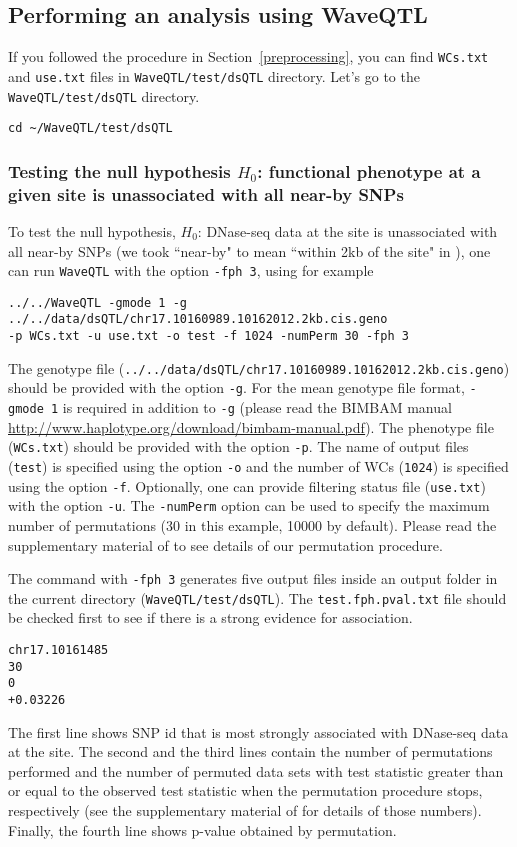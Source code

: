 \documentclass[11pt]{article}
\begin{document}
\subsection{Performing an analysis using WaveQTL}
If you followed the procedure in Section~\ref{preprocessing}, you can find {\tt WCs.txt} and {\tt use.txt} files in {\tt WaveQTL/test/dsQTL} directory. Let's go to the {\tt WaveQTL/test/dsQTL} directory.
\begin{verbatim}
cd ~/WaveQTL/test/dsQTL
\end{verbatim}
\subsubsection{Testing the null hypothesis $H_0$: functional phenotype at a given site is unassociated with all near-by SNPs}
To test the null hypothesis, $H_0$: DNase-seq data at the site is unassociated with all near-by SNPs (we took ``near-by" to mean ``within 2kb of the
site" in \cite{Shim2014}), one can run {\tt WaveQTL} with the option {\tt -fph 3}, using for example
\begin{verbatim}
../../WaveQTL -gmode 1 -g ../../data/dsQTL/chr17.10160989.10162012.2kb.cis.geno 
-p WCs.txt -u use.txt -o test -f 1024 -numPerm 30 -fph 3
\end{verbatim}
The genotype file ({\tt ../../data/dsQTL/chr17.10160989.10162012.2kb.cis.geno}) should be provided with the option {\tt -g}. For the mean genotype file format, {\tt -gmode 1} is required in addition to {\tt -g} (please read the BIMBAM manual \url{http://www.haplotype.org/download/bimbam-manual.pdf}).  The phenotype file ({\tt WCs.txt}) should be provided with the option {\tt -p}. The name of output files ({\tt test}) is specified using the option {\tt -o} and the number of WCs ({\tt 1024}) is specified using the option {\tt -f}. Optionally, one can provide filtering status file ({\tt use.txt}) with the option {\tt -u}. The {\tt -numPerm} option can be used to specify the maximum number of permutations (30 in this example, 10000 by default). Please read the supplementary material of \cite{Shim2014} to see details of our permutation procedure. 

The command with {\tt -fph 3} generates five output files inside an output folder in the current directory ({\tt WaveQTL/test/dsQTL}). The {\tt test.fph.pval.txt} file should be checked first to see if there is a strong evidence for association.
\begin{verbatim}
chr17.10161485
30
0
+0.03226
\end{verbatim}
The first line shows SNP id that is most strongly associated with DNase-seq data at the site. The second and the third lines contain the number of permutations performed and the number of permuted data sets with test statistic greater than or equal to the observed test statistic when the permutation procedure stops, respectively (see the supplementary material of \cite{Shim2014} for details of those numbers). Finally, the fourth line shows p-value obtained by permutation.
\end{document}
